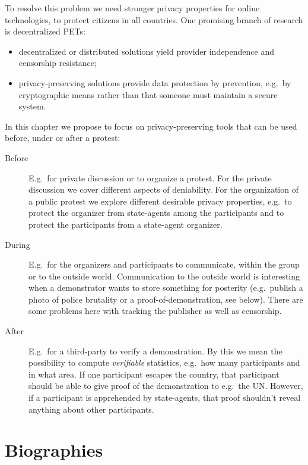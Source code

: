 \documentclass[a4paper]{llncs}
\begin{document}
To resolve this problem we need stronger privacy properties for online 
technologies, to protect citizens in all countries.
One promising branch of research is decentralized \acp{PET}:
\begin{itemize}
  \item decentralized or distributed solutions yield provider independence and 
    censorship resistance;
  \item privacy-preserving solutions provide data protection by prevention, 
    e.g.\ by cryptographic means rather than that someone must maintain 
    a secure system.
\end{itemize}
In this chapter we propose to focus on privacy-preserving tools that can be 
used before, under or after a protest:
\begin{description}

  \item[Before] E.g.\ for private discussion or to organize 
    a protest.
    For the private discussion we cover different aspects of deniability.
    For the organization of a public protest we explore different desirable 
    privacy properties, e.g.\ to protect the organizer from state-agents among 
    the participants and to protect the participants from a state-agent 
    organizer.

  \item[During] E.g.\ for the organizers and participants to communicate, 
    within the group or to the outside world.
    Communication to the outside world is interesting when a demonstrator wants 
    to store something for posterity (e.g.\ publish a photo of police brutality 
    or a proof-of-demonstration, see below).
    There are some problems here with tracking the publisher as well as 
    censorship.

  \item[After] E.g.\ for a third-party to verify a demonstration.
    By this we mean the possibility to compute \emph{verifiable} statistics, 
    e.g.\ how many participants and in what area.
    If one participant escapes the country, that participant should be able to 
    give proof of the demonstration to e.g.\ the UN\@.
    However, if a participant is apprehended by state-agents, that proof 
    shouldn't reveal anything about other participants.

\end{description}




\appendix
\section{Biographies}
\label{Biography}
\end{document}
